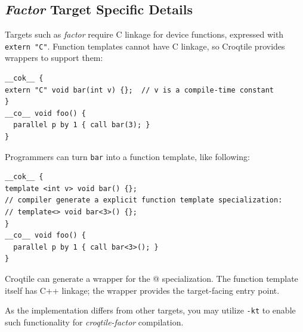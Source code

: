 \subsection*{\emph{Factor} Target Specific Details}

Targets such as \emph{factor} require C linkage for device functions, expressed with \texttt{extern "C"}. Function templates cannot have C linkage, so Croqtile provides wrappers to support them:

\begin{lstlisting}[language=croqtile,caption={A cok block around device code}]
__cok__ {
extern "C" void bar(int v) {};  // v is a compile-time constant
}
__co__ void foo() {
  parallel p by 1 { call bar(3); }
}
\end{lstlisting}

Programmers can turn \texttt{bar} into a function template, like following:

\begin{lstlisting}[language=croqtile,caption={The block after factoring target-specific details}]
__cok__ {
template <int v> void bar() {};
// compiler generate a explicit function template specialization:
// template<> void bar<3>() {};
}
__co__ void foo() {
  parallel p by 1 { call bar<3>(); }
}
\end{lstlisting}

Croqtile can generate a wrapper for the @ specialization. The function template itself has C++ linkage; the wrapper provides the target-facing entry point.

As the implementation differs from other targets, you may utilize \texttt{-kt} to enable such functionality for \emph{croqtile-factor} compilation.
